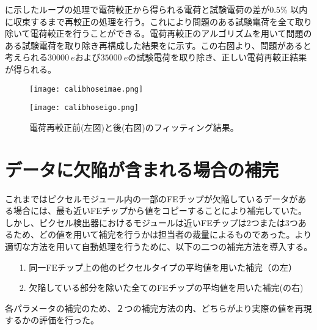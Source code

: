 に示したループの処理で電荷較正から得られる電荷と試験電荷の差が0.5\% 以内に収束するまで再較正の処理を行う。これにより問題のある試験電荷を全て取り除いて電荷較正を行うことができる。電荷再較正のアルゴリズムを用いて問題のある試験電荷を取り除き再構成した結果をに示す。この右図より、問題があると考えられる$30000\ \si{e}$および$35000\ \si{e}$の試験電荷を取り除き、正しい電荷再較正結果が得られる。

\begin{figure}[tbp]
  \begin{minipage}[b]{0.5\linewidth}
    \centering
    \texttt{[image: calibhoseimae.png]}
  \end{minipage}
  \begin{minipage}[b]{0.5\linewidth}
    \centering
    \texttt{[image: calibhoseigo.png]}
  \end{minipage}
  \caption[電荷再較正前後のフィッティング結果]{電荷再較正前(左図)と後(右図)のフィッティング結果。}
  \label{fig:calibhosei}
\end{figure}


\section{データに欠陥が含まれる場合の補完}
\label{sec:kessonhosei}
これまではピクセルモジュール内の一部のFEチップが欠陥しているデータがある場合には、最も近いFEチップから値をコピーすることにより補完していた。しかし、ピクセル検出器におけるモジュールは近いFEチップは2つまたは3つあるため、どの値を用いて補完を行うかは担当者の裁量によるものであった。より適切な方法を用いて自動処理を行うために、以下の二つの補完方法を導入する。
\begin{itemize}
  \item[1. ] 同一FEチップ上の他のピクセルタイプの平均値を用いた補完（の左）
  \item[2. ] 欠陥している部分を除いた全てのFEチップの平均値を用いた補完(の右)
\end{itemize}
各パラメータの補完のため、２つの補完方法の内、どちらがより実際の値を再現するかの評価を行った。

